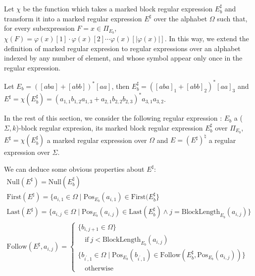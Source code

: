 \documentclass{llncs}
\begin{document}
	Let $\chi$ be the function which takes a marked block regular expression $E_b^{\sharp}$ and transform it into a marked regular expression $E^{\sharp}$ over the alphabet $\Omega$ such that, for every subexpression $F = x \in \Pi_{E_b}$, $\chi(F) = \varphi(x)[1] \cdot \varphi(x)[2] \cdots \varphi(x)[|\varphi(x)|]$.
	In this way, we extend the definition of marked regular expresion to regular expressions over an alphabet indexed by any number of element, and whose symbol appear only once in the regular expression.
	
	\begin{example}
		Let $E_b = ([aba] + [abb])^*[aa]$, then $E_b^{\sharp} = ([aba]_1 + [abb]_2)^*[aa]_3$ and $E^{\sharp} = \chi(E_b^{\sharp}) = (a_{1, 1}b_{1, 2}a_{1, 3} + a_{2, 1}b_{2, 2}b_{2, 3})^*a_{3, 1}a_{3, 2}$.
	\end{example}
	
	In the rest of this section, we consider the following regular expression : $E_b$ a ($\Sigma, k$)-block regular expresion, its marked block regular expression $E_b^{\sharp}$ over $\Pi_{E_b}$, $E^{\sharp} = \chi(E_b^{\sharp})$ a marked regular expression over $\Omega$ and $E = (E^{\sharp})^{\natural}$ a regular expression over $\Sigma$.

We can deduce some obvious properties about $E^{\sharp}$:
	\begin{gather}
		\mathrm{Null}(E^{\sharp}) = \mathrm{Null}(E_b^{\sharp}) \label{claim:null}\\
		\mathrm{First}(E^{\sharp}) = \{a_{i, 1} \in \Omega \mid \mathrm{Pos}_{E_b}(a_{i, 1}) \in \mathrm{First}(E_b^{\sharp}\} \label{claim:first}\\
		\mathrm{Last}(E^{\sharp}) = \{a_{i, j} \in \Omega \mid \mathrm{Pos}_{E_b}(a_{i, j}) \in \mathrm{Last}(E_b^{\sharp}) \wedge j = \mathrm{BlockLength}_{E_b}(a_{i, j})\} \label{claim:last}\\
		\mathrm{Follow}(E^{\sharp}, a_{i, j}) = 
			\begin{cases}
				\{b_{i, j+1} \in \Omega\}\\
				\quad \text{if}\ j < \mathrm{BlockLength}_{E_b}(a_{i, j})\\
				\{b_{i^{\prime}, 1} \in \Omega \mid \mathrm{Pos}_{E_b}(b_{i^{\prime}, 1}) \in \mathrm{Follow}(E_b^{\sharp}, \mathrm{Pos}_{E_b}(a_{i, j}))\}\\
				\quad \text{otherwise}
			\end{cases}	\label{claim:follow}
	\end{gather}
\end{document}

